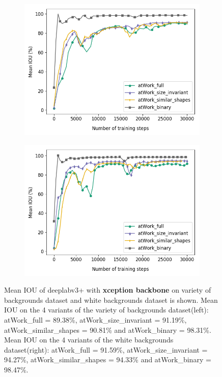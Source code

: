 	\begin{figure}[!htb]
		\begin{subfigure}{.5\textwidth}
			\centering
			\includegraphics[width=1\linewidth]{images/xcep_4vars}
		\end{subfigure}
		\begin{subfigure}{.5\textwidth}
			\centering
			\includegraphics[width=1\linewidth]{images/xcep_4vars_white}
		\end{subfigure}
		\caption{Mean IOU of deeplabv3+ with \textbf{xception backbone} on variety of backgrounds dataset and white backgrounds dataset is shown. Mean IOU on the 4 variants of the variety of backgrounds dataset(left): atWork\_full = 89.38\%, atWork\_size\_invariant = 91.19\%, atWork\_similar\_shapes = 90.81\% and atWork\_binary = 98.31\%. Mean IOU on the 4 variants of the white backgrounds dataset(right): atWork\_full = 91.59\%, atWork\_size\_invariant = 94.27\%, atWork\_similar\_shapes = 94.33\% and atWork\_binary = 98.47\%.}
		\label{Fig:xcepvars}
	\end{figure}
	
